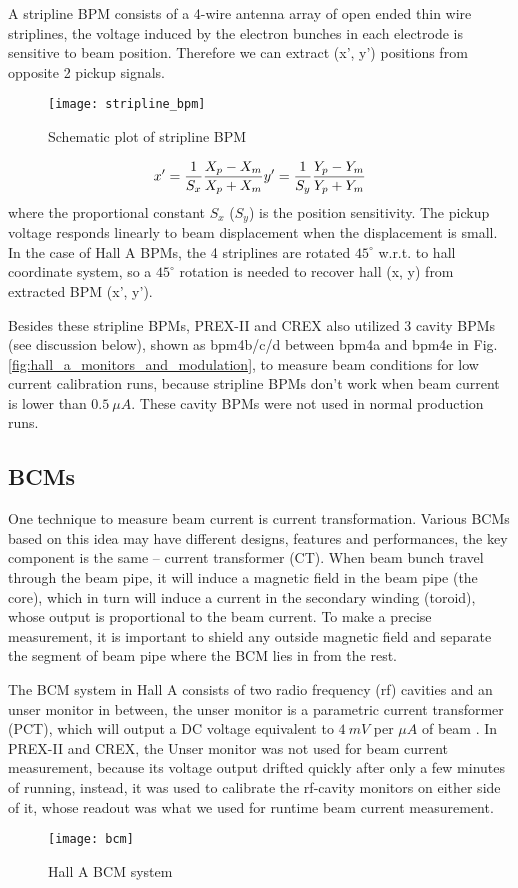 A stripline BPM consists of a 4-wire antenna array of open ended thin wire striplines, 
the voltage induced by the electron bunches in each electrode is sensitive to beam position.
Therefore we can extract (x', y') positions from opposite 2 pickup signals.
\begin{figure}
    \centering
    \texttt{[image: stripline\_bpm]}
    \caption{Schematic plot of stripline BPM}
\end{figure}
\begin{equation}
    x' = \frac{1}{S_x} \frac{X_p - X_m}{X_p + X_m}   \\
    y' = \frac{1}{S_y} \frac{Y_p - Y_m}{Y_p + Y_m}   
\end{equation}
where the proportional constant $S_x$ ($S_y$) is the position sensitivity. 
The pickup voltage responds linearly to beam displacement when the displacement
is small. In the case of Hall A BPMs, the 4 striplines are rotated $45^\circ$
w.r.t. to hall coordinate system, so a $45^\circ$ rotation is needed to recover
hall (x, y) from extracted BPM (x', y').

Besides these stripline BPMs, PREX-II and CREX also utilized 3 cavity BPMs (see discussion below),
shown as bpm4b/c/d between bpm4a and bpm4e in Fig. \ref{fig:hall_a_monitors_and_modulation},
to measure beam conditions for low current calibration runs, because stripline
BPMs don't work when beam current is lower than $0.5\ \mu A$. These cavity
BPMs were not used in normal production runs.

\subsection{BCMs}
One technique to measure beam current is current transformation.
Various BCMs based on this idea may have different designs, features and performances, 
the key component is the same -- current transformer (CT). When beam bunch 
travel through the beam pipe, it will induce a magnetic field in the beam pipe (the core), 
which in turn will induce a current in the secondary winding (toroid), 
whose output is proportional to the beam current. 
To make a precise measurement, it is important to shield any outside magnetic 
field and separate the segment of beam pipe where the BCM lies in from the rest.

The BCM system in Hall A consists of two radio frequency (rf) cavities and
an unser monitor in between, the unser monitor is a parametric current transformer (PCT),
which will output a DC voltage equivalent to $4\ mV$ per $\mu A$ of beam \cite{987367}.
In PREX-II and CREX, the Unser monitor was not used for beam current measurement,
because its voltage output drifted quickly after only a few minutes of running,
instead, it was used to calibrate the rf-cavity monitors on either side of it,
whose readout was what we used for runtime beam current measurement.
\begin{figure}
    \centering
    \texttt{[image: bcm]}
    \caption{Hall A BCM system \cite{987367}}
\end{figure}

